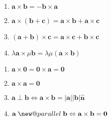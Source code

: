 \documentclass[11pt,a4paper]{book}
\makeatletter
\newcommand{\newparallel}{\mathrel{\mathpalette\new@parallel\relax}}
\newcommand{\new@parallel}[2]{%
  \begingroup
  \sbox\z@{$#1T$}%
  \resizebox{!}{\ht\z@}{\raisebox{\depth}{$\m@th#1/\mkern-5mu/$}}%
  \endgroup
}
\makeatother
\begin{document}
\begin{minipage}[t]{0.5\textwidth}
\begin{enumerate}

\item  $\textbf{a}\times\textbf{b}=-\textbf{b}\times\textbf{a}$

\item  $\textbf{a}\times\left(\textbf{b}+\textbf{c}\right)=\textbf{a}\times\textbf{b}+\textbf{a}\times\textbf{c}$

\item  $\left(\textbf{a}+\textbf{b}\right)\times\textbf{c}=\textbf{a}\times\textbf{c}+\textbf{b}\times\textbf{c}$

\item  $\lambda\textbf{a}\times\mu\textbf{b}=\lambda\mu\left(\textbf{a}\times\textbf{b}\right)$
\end{enumerate}

\end{minipage}
\begin{minipage}[t]{0.5\textwidth}
\begin{enumerate}[start=5]

\item  $\textbf{a}\times\textbf{0}=\textbf{0}\times\textbf{a}=\textbf{0}$

\item  $\textbf{a}\times\textbf{a}=\textbf{0}$

\item  $\textbf{a}\perp\textbf{b}\Leftrightarrow\textbf{a}\times\textbf{b}=\left|\textbf{a}\right|\left|\textbf{b}\right|\hat{\textbf{n}}$

\item  $\textbf{a}\newparallel\textbf{b}\Leftrightarrow\textbf{a}\times\textbf{b}=\textbf{0}$

\end{enumerate}
\end{minipage}
\end{document}
